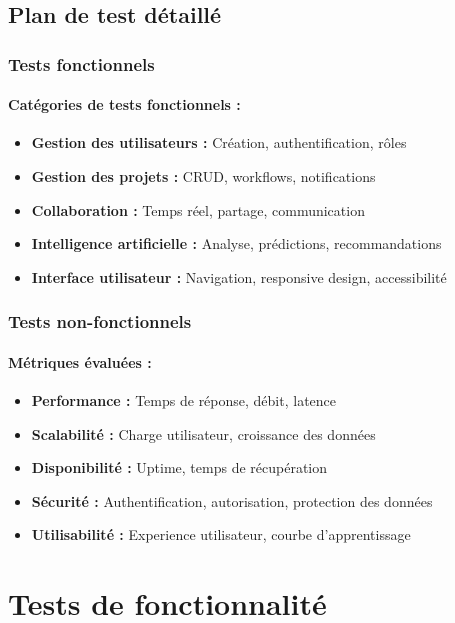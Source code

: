 \subsection{Plan de test détaillé}

\subsubsection{Tests fonctionnels}
\paragraph{Catégories de tests fonctionnels :}
\begin{itemize}
    \item \textbf{Gestion des utilisateurs :} Création, authentification, rôles
    \item \textbf{Gestion des projets :} CRUD, workflows, notifications
    \item \textbf{Collaboration :} Temps réel, partage, communication
    \item \textbf{Intelligence artificielle :} Analyse, prédictions, recommandations
    \item \textbf{Interface utilisateur :} Navigation, responsive design, accessibilité
\end{itemize}

\subsubsection{Tests non-fonctionnels}
\paragraph{Métriques évaluées :}
\begin{itemize}
    \item \textbf{Performance :} Temps de réponse, débit, latence
    \item \textbf{Scalabilité :} Charge utilisateur, croissance des données
    \item \textbf{Disponibilité :} Uptime, temps de récupération
    \item \textbf{Sécurité :} Authentification, autorisation, protection des données
    \item \textbf{Utilisabilité :} Experience utilisateur, courbe d'apprentissage
\end{itemize}

\section{Tests de fonctionnalité}

